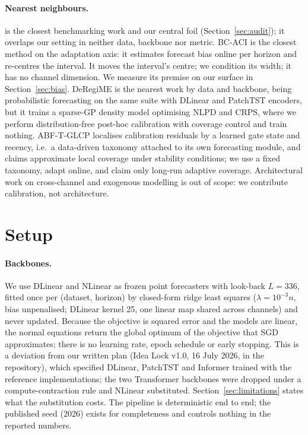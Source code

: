 \documentclass[11pt]{article}
\begin{document}
\paragraph{Nearest neighbours.} \citet{cpsurvey} is the closest benchmarking work and our central foil (Section~\ref{sec:audit}); it overlaps our setting in neither data, backbone nor metric. BC-ACI \citep{bcaci} is the closest method on the adaptation axis: it estimates forecast bias online per horizon and re-centres the interval. It moves the interval's centre; we condition its width; it has no channel dimension. We measure its premise on our surface in Section~\ref{sec:bias}. DeRegiME \citep{deregime} is the nearest work by data and backbone, being probabilistic forecasting on the same suite with DLinear and PatchTST encoders, but it trains a sparse-GP density model optimising NLPD and CRPS, where we perform distribution-free post-hoc calibration with coverage control and train nothing. ABF-T-GLCP \citep{glcp} localises calibration residuals by a learned gate state and recency, i.e.\ a data-driven taxonomy attached to its own forecasting module, and claims approximate local coverage under stability conditions; we use a fixed taxonomy, adapt online, and claim only long-run adaptive coverage. Architectural work on cross-channel and exogenous modelling \citep{itransformer,timexer} is out of scope: we contribute calibration, not architecture.

\section{Setup}\label{sec:setup}

\paragraph{Backbones.} We use DLinear and NLinear \citep{dlinear} as frozen point forecasters with look-back $L = 336$, fitted once per (dataset, horizon) by closed-form ridge least squares ($\lambda = 10^{-3} n$, bias unpenalised; DLinear kernel 25, one linear map shared across channels) and never updated. Because the objective is squared error and the models are linear, the normal equations return the global optimum of the objective that SGD approximates; there is no learning rate, epoch schedule or early stopping. This is a deviation from our written plan (Idea Lock v1.0, 16 July 2026, in the repository), which specified DLinear, PatchTST and Informer trained with the reference implementations; the two Transformer backbones were dropped under a compute-contraction rule and NLinear substituted. Section~\ref{sec:limitations} states what the substitution costs. The pipeline is deterministic end to end; the published seed (2026) exists for completeness and controls nothing in the reported numbers.
\end{document}
